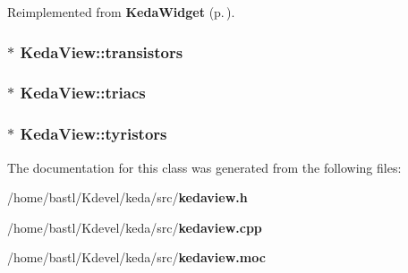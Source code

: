 Reimplemented from {\bf Keda\-Widget} {\rm (p.\,\pageref{classKedaWidget_cc50694e7f83c0ae0893748ea6da5f59})}.
\subsubsection{ $\ast$ {\bf Keda\-View::transistors}}\label{classKedaView_ff750796e6ff1fb40d6a8248a6485dc3}


\subsubsection{ $\ast$ {\bf Keda\-View::triacs}}\label{classKedaView_569e25e22a19c874e250c6c041b16f40}


\subsubsection{ $\ast$ {\bf Keda\-View::tyristors}}\label{classKedaView_68d2b8e9f08c565a5a790ef5647bf776}




The documentation for this class was generated from the following files:\begin{CompactItemize}
\item 
/home/bastl/Kdevel/keda/src/{\bf kedaview.h}\item 
/home/bastl/Kdevel/keda/src/{\bf kedaview.cpp}\item 
/home/bastl/Kdevel/keda/src/{\bf kedaview.moc}\end{CompactItemize}
